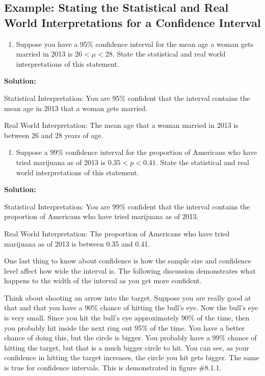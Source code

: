 \documentclass[
]{book}
\providecommand{\tightlist}{%
  \setlength{\itemsep}{0pt}\setlength{\parskip}{0pt}}
\begin{document}
\hypertarget{example-stating-the-statistical-and-real-world-interpretations-for-a-confidence-interval}{%
\subsection{Example: Stating the Statistical and Real World Interpretations for a Confidence Interval}\label{example-stating-the-statistical-and-real-world-interpretations-for-a-confidence-interval}}

\begin{enumerate}
\def\labelenumi{\alph{enumi}.}
\tightlist
\item
  Suppose you have a 95\% confidence interval for the mean age a woman gets married in 2013 is \(26<\mu<28\). State the statistical and real world interpretations of this statement.
\end{enumerate}

\textbf{Solution:}

Statistical Interpretation: You are 95\% confident that the interval contains the mean age in 2013 that a woman gets married.

Real World Interpretation: The mean age that a woman married in 2013 is between 26 and 28 years of age.

\begin{enumerate}
\def\labelenumi{\alph{enumi}.}
\setcounter{enumi}{1}
\tightlist
\item
  Suppose a 99\% confidence interval for the proportion of Americans who have tried marijuana as of 2013 is \(0.35<p<0.41\). State the statistical and real world interpretations of this statement.
\end{enumerate}

\textbf{Solution:}

Statistical Interpretation: You are 99\% confident that the interval contains the proportion of Americans who have tried marijuana as of 2013.

Real World Interpretation: The proportion of Americans who have tried marijuana as of 2013 is between 0.35 and 0.41.

One last thing to know about confidence is how the sample size and confidence level affect how wide the interval is. The following discussion demonstrates what happens to the width of the interval as you get more confident.

Think about shooting an arrow into the target. Suppose you are really good at that and that you have a 90\% chance of hitting the bull's eye. Now the bull's eye is very small. Since you hit the bull's eye
approximately 90\% of the time, then you probably hit inside the next ring out 95\% of the time. You have a better chance of doing this, but the circle is bigger. You probably have a 99\% chance of hitting the target, but that is a much bigger circle to hit. You can see, as your confidence in hitting the target increases, the circle you hit gets bigger. The same is true for confidence intervals. This is demonstrated in figure \#8.1.1.
\end{document}
